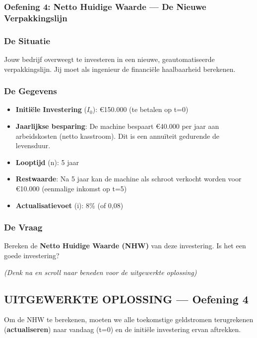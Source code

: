 \documentclass[a4paper,11pt]{article}
\begin{document}
\begin{oefenblok}
    \subsubsection*{Oefening 4: Netto Huidige Waarde — De Nieuwe Verpakkingslijn}

    \subsubsection*{De Situatie}
    Jouw bedrijf overweegt te investeren in een nieuwe, geautomatiseerde verpakkingslijn. Jij moet als ingenieur de financiële haalbaarheid berekenen.

    \subsubsection*{De Gegevens}

    \begin{itemize}
        \item \textbf{Initiële Investering} ($I_0$): €150.000 (te betalen op t=0)
        \item \textbf{Jaarlijkse besparing}: De machine bespaart €40.000 per jaar aan arbeidskosten (netto kasstroom). Dit is een annuïteit gedurende de levensduur.
        \item \textbf{Looptijd} (n): 5 jaar
        \item \textbf{Restwaarde}: Na 5 jaar kan de machine als schroot verkocht worden voor €10.000 (eenmalige inkomst op t=5)
        \item \textbf{Actualisatievoet} (i): 8\% (of 0,08)
    \end{itemize}

    \subsubsection*{De Vraag}
    Bereken de \textbf{Netto Huidige Waarde (NHW)} van deze investering. Is het een goede investering?

    \vspace{0.3cm}
    \textit{(Denk na en scroll naar beneden voor de uitgewerkte oplossing)}

    \subsection*{UITGEWERKTE OPLOSSING — Oefening 4}

    Om de NHW te berekenen, moeten we alle toekomstige geldstromen terugrekenen (\textbf{actualiseren}) naar vandaag (t=0) en de initiële investering ervan aftrekken.


\end{oefenblok}
\end{document}
